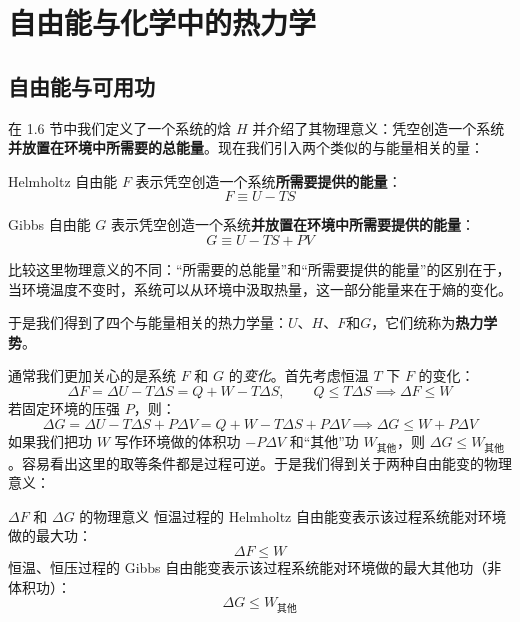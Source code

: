 \chapter{自由能与化学中的热力学}

\section{自由能与可用功}
在 1.6 节中我们定义了一个系统的焓 $H$ 并介绍了其物理意义：凭空创造一个系统\textbf{并放置在环境中所需要的总能量}。现在我们引入两个类似的与能量相关的量：
\begin{definition}
    Helmholtz 自由能 $F$ 表示凭空创造一个系统\textbf{所需要提供的能量}：
    \begin{equation}
        F \equiv U- TS
    \end{equation}
\end{definition}
\begin{definition}
    Gibbs 自由能 $G$ 表示凭空创造一个系统\textbf{并放置在环境中所需要提供的能量}：
    \begin{equation}
        G \equiv U- TS + PV
    \end{equation}
\end{definition}
\begin{remark}
    比较这里物理意义的不同：``所需要的总能量''和``所需要提供的能量''的区别在于，当环境温度不变时，系统可以从环境中汲取热量，这一部分能量来在于熵的变化。
\end{remark}
于是我们得到了四个与能量相关的热力学量：$U$、$H$、$F$和$G$，它们统称为\textbf{热力学势}。


通常我们更加关心的是系统 $F$ 和 $G$ 的\textit{变化}。首先考虑恒温 $T$ 下 $F$ 的变化：
\begin{equation}
    \Delta F
    =\Delta U-T\Delta S
    =Q+W-T\Delta S,\qquad Q\le T\Delta S
    \implies \Delta F\le W
\end{equation}
若固定环境的压强 $P$，则：
\begin{equation}
    \Delta G
    =\Delta U-T\Delta S+P\Delta V
    =Q+W-T\Delta S+P\Delta V
    \implies \Delta G\le W+P\Delta V
\end{equation}
如果我们把功 $W$ 写作环境做的体积功 $-P\Delta V$ 和``其他''功 $W_\text{其他}$，则 $\Delta G \le W_\text{其他}$。容易看出这里的取等条件都是过程可逆。于是我们得到关于两种自由能变的物理意义：
\begin{corollary}{$\Delta F$ 和 $\Delta G$ 的物理意义}
    恒温过程的 Helmholtz 自由能变表示该过程系统能对环境做的最大功：
    \begin{equation}
        \Delta F \le W
    \end{equation}
    恒温、恒压过程的 Gibbs 自由能变表示该过程系统能对环境做的最大其他功（非体积功）：
    \begin{equation}
        \Delta G \le W_\text{其他}
    \end{equation}
\end{corollary}

